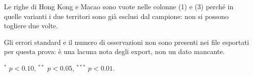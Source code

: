 \begin{table}[htbp]
\begin{threeparttable}
\begin{tablenotes}[flushleft]
\item Le righe di Hong Kong e Macao sono vuote nelle colonne (1) e (3) perch\'e in quelle varianti i due territori sono gi\`a esclusi dal campione: non si possono togliere due volte.
\item Gli errori standard e il numero di osservazioni non sono presenti nei file esportati per questa prova: \`e una lacuna nota degli export, non un dato mancante.
\item $^{*}$ $p<0.10$, $^{**}$ $p<0.05$, $^{***}$ $p<0.01$.
\end{tablenotes}
\end{threeparttable}
\end{table}
